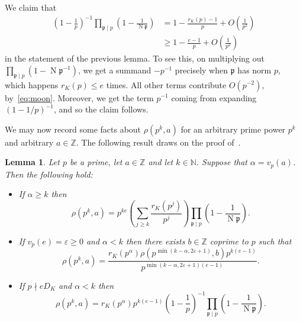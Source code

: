 \documentclass[11pt,letterpaper]{amsart}
\renewcommand{\leq}{\leqslant}
\renewcommand{\geq}{\geqslant}
\newtheorem{lemma}[theorem]{Lemma}
\theoremstyle{definition}
\numberwithin{equation}{section}
\newcommand\ZZ{\mathbb{Z}}
\newcommand\NN{\mathbb{N}}
\newcommand{\ve}{\varepsilon}
\DeclareMathOperator{\n}{N}
\newcommand{\fp}{\mathfrak{p}}
\newcommand{\0}{\mathbf{0}}
\begin{document}
We claim that 
\begin{equation}\label{eq:clip}
\begin{split}
\left(1-\frac{1}{p}\right)^{-1}\prod_{\fp\mid p} \left(1-\frac{1}{\n \fp}\right)
&=1-\frac{r_K(p)-1}{p}+O\left(\frac{1}{p^2}\right)\\
&\geq
1-\frac{e-1}{p}+O\left(\frac{1}{p^2}\right)
\end{split}
\end{equation}
in the statement of the previous lemma.  To see this, on  multiplying out $\prod_{\fp\mid p }(1-\n \fp^{-1})$, we get a summand 
$-p^{-1}$ precisely when $\fp$ has norm $p$, which happens $r_K(p)\leq e$ times. All other terms contribute $O(p^{-2})$, by~\eqref{eq:moon}.
Moreover, we get the term $p^{-1}$ coming from expanding $(1-1/p)^{-1}$, and so the claim follows.

We  may now record some facts about $\rho(p^k,a)$ for an arbitrary prime power $p^k$ and arbitrary $a\in \ZZ$.  The  following result draws on  the proof of~\cite[Lemma~4.2]{nf}.

\begin{lemma}\label{lem:LM}
Let $p$ be a prime, 
let $a\in \ZZ$ and let  $k\in \NN$.
 Suppose that $\alpha=v_p(a)$.
Then  the following hold:
\begin{itemize}
\item[(i)] If $\alpha\geq k$ then 
$$
\rho(p^k,a)=p^{ke} \left(\sum_{j\geq k}\frac{r_K(p^j)}{p^j}\right)
\prod_{\fp\mid p} \left(1-\frac{1}{\n \fp}\right).
$$
\item[(ii)] If $v_p(e)=\ve\geq 0$ and $\alpha<k$  then there exists $b\in \ZZ$ coprime to $p$ such that 
$$
\rho(p^k,a) = \frac{r_K(p^\alpha) \rho(p^{\min(k-\alpha,2\ve+1)},b) p^{k(e-1)} }{p^{\min(k-\alpha,2\ve+1)(e-1)}}.$$
\item[(iii)] 
If $p\nmid eD_K$ and $\alpha<k$ then
$$
\rho(p^k,a)=r_K(p^{\alpha})p^{k(e-1)}\left(1-\frac{1}{p}\right)^{-1}\prod_{\fp\mid p} \left(1-\frac{1}{\n \fp}\right).
$$
 \end{itemize}
\end{lemma}
\end{document}
